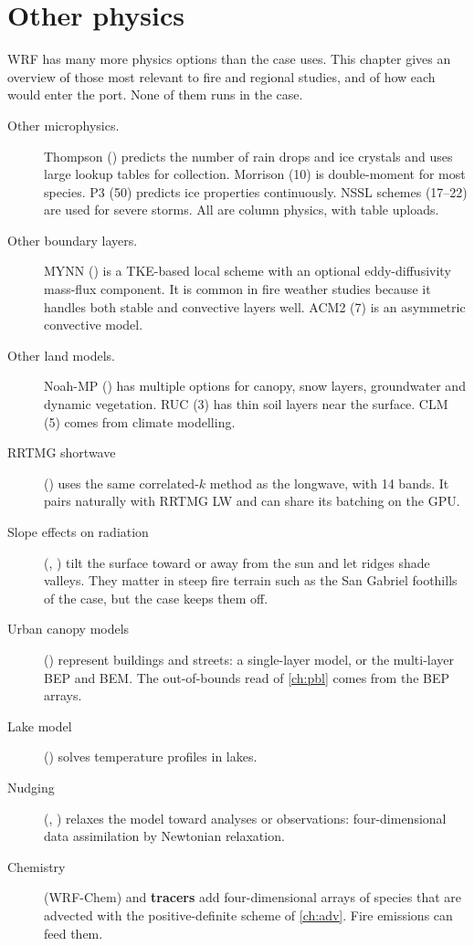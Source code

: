 \chapter{Other physics}\label{ch:otherphys}

WRF has many more physics options than the case uses. This chapter gives an overview of those most relevant to fire
and regional studies, and of how each would enter the port. None of them runs in the case.

\begin{description}
  \item[Other microphysics.] Thompson () predicts the number of rain drops and ice crystals and
    uses large lookup tables for collection. Morrison (10) is double-moment for most species. P3 (50) predicts ice
    properties continuously. NSSL schemes (17--22) are used for severe storms. All are column physics, with table
    uploads.
  \item[Other boundary layers.] MYNN () is a TKE-based local scheme with an optional
    eddy-diffusivity mass-flux component. It is common in fire weather studies because it handles both stable and
    convective layers well. ACM2 (7) is an asymmetric convective model.
  \item[Other land models.] Noah-MP () has multiple options for canopy, snow layers,
    groundwater and dynamic vegetation. RUC (3) has thin soil layers near the surface. CLM (5) comes from climate
    modelling.
  \item[RRTMG shortwave] () uses the same correlated-$k$ method as the longwave, with 14
    bands. It pairs naturally with RRTMG LW and can share its batching on the GPU.
  \item[Slope effects on radiation] (, ) tilt the surface toward or away from the
    sun and let ridges shade valleys. They matter in steep fire terrain such as the San Gabriel foothills of the case,
    but the case keeps them off.
  \item[Urban canopy models] () represent buildings and streets: a single-layer model, or the
    multi-layer BEP and BEM. The out-of-bounds read of \cref{ch:pbl} comes from the BEP arrays.
  \item[Lake model] () solves temperature profiles in lakes.
  \item[Nudging] (, ) relaxes the model toward analyses or observations: four-dimensional
    data assimilation by Newtonian relaxation.
  \item[Chemistry] (WRF-Chem) and \textbf{tracers} add four-dimensional arrays of species that are advected with the
    positive-definite scheme of \cref{ch:adv}. Fire emissions can feed them.
\end{description}

